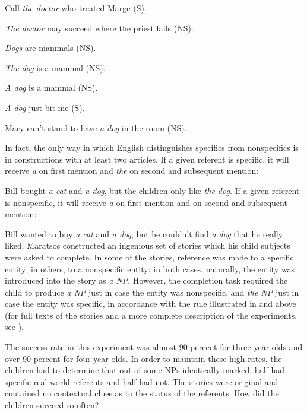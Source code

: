 \ea\label{ex:3:2}
 Call \textit{the doctor} who treated Marge (S).
\z

\ea\label{ex:3:3}
 \textit{The doctor} may succeed where the priest fails (NS).
\z

\ea\label{ex:3:4}
 \textit{Dogs} are mammals (NS).
\z

\ea\label{ex:3:5}
 \textit{The dog} is a mammal (NS).
\z

\ea\label{ex:3:6}
 \textit{A dog} is a mammal (NS).
\z

\ea\label{ex:3:7}
\textit{A dog} just bit me (S).
\z

\ea\label{ex:3:8}
 Mary can't stand to have \textit{a dog} in the room (NS). 
\z

In fact, the only way in which English distinguishes specifics from nonspecifics is in constructions with at least two articles. If a given referent is specific, it will receive \textit{a} on first mention and \textit{the} on second and subsequent mention:

\ea\label{ex:3:9}
 Bill bought \textit{a cat} and \textit{a dog}, but the children only like \textit{the dog}.
\glt
\z
If a given referent is nonspecific, it will receive \textit{a} on first mention and on second and subsequent mention:

\ea\label{ex:3:10}
 Bill wanted to buy \textit{a cat} and \textit{a dog}, but he couldn't find \textit{a dog} that he really liked.
\z
Maratsos constructed an ingenious set of stories which his child subjects were asked to complete. In some of the stories, reference was made to a specific entity; in others, to a nonspecific entity; in both cases, naturally, the entity was introduced into the story as \textit{a NP}. However, the completion task required the child to produce \textit{a NP} just in case the entity was nonspecific, and \textit{the NP} just in case the entity was specific, in accordance with the rule illustrated in  and  above (for full texts of the stories and a more complete description of the experiments, see \citealt{Maratsos1976}).

The success rate in this experiment was almost 90 percent for three-year-olds and over 90 percent for four-year-olds. In order to maintain these high rates, the children had to determine that out of some NPs identically marked, half had specific real-world referents and half had not. The stories were original and contained no contextual clues as to the status of the referents. How did the children succeed so often?

